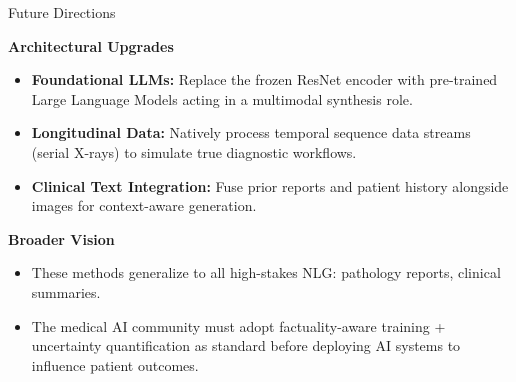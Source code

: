 \documentclass[aspectratio=169]{beamer}
\begin{document}
\begin{frame}{Future Directions}
  
  \textbf{Architectural Upgrades}
  \begin{itemize}
    \item \textbf{Foundational LLMs:} Replace the frozen ResNet encoder with pre-trained Large Language Models acting in a multimodal synthesis role.
    \item \textbf{Longitudinal Data:} Natively process temporal sequence data streams (serial X-rays) to simulate true diagnostic workflows.
    \item \textbf{Clinical Text Integration:} Fuse prior reports and patient history alongside images for context-aware generation.
  \end{itemize}
  
  \vspace{0.4cm}
  
  \textbf{Broader Vision}
  \begin{itemize}
    \item These methods generalize to all high-stakes NLG: pathology reports, clinical summaries.
    \item The medical AI community must adopt factuality-aware training + uncertainty quantification as standard before deploying AI systems to influence patient outcomes.
  \end{itemize}
  
\end{frame}
\end{document}
